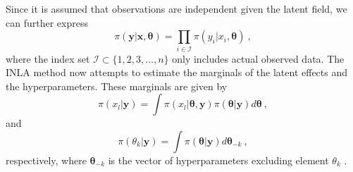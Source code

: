 Since it is assumed that observations are independent given the latent field, we can further express
\begin{equation}
    \pi(\mathbf{y} \lvert \boldsymbol{x}, \boldsymbol{\theta}) = \prod_{i\in \mathcal{I}} \pi(y_i \lvert x_i, \boldsymbol{\theta}) \ ,
\end{equation}
where the index set $\mathcal{I} \subset \{1, 2, 3, \ldots, n\}$ only includes actual observed data. %
The INLA method now attempts to estimate the marginals of the latent effects and the hyperparameters. These marginals are given by
\begin{equation}
    \label{eq:INLA_marginals}
    \pi(x_l \lvert \mathbf{y}) = \int \pi(x_l \lvert \boldsymbol{\theta}, \mathbf{y}) \pi(\boldsymbol{\theta} \lvert \mathbf{y}) d\boldsymbol{\theta} \ ,
\end{equation}
and 
\begin{equation}
    \label{eq:INLA_marginals_hyperparameters}
    \pi(\theta_k \lvert \mathbf{y}) = \int \pi(\boldsymbol{\theta} \lvert \mathbf{y}) d\boldsymbol{\theta}_{-k} \ ,
\end{equation}
respectively, where $\boldsymbol{\theta}_{-k}$ is the vector of hyperparameters excluding element $\theta_k$ \citep{gomezrubio2020inla}. 
